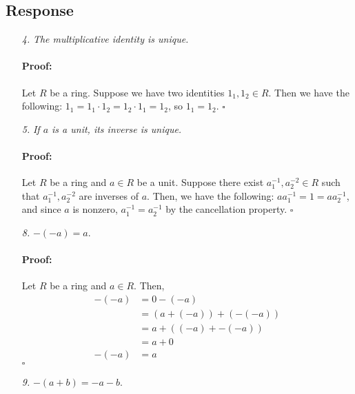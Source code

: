 \documentclass [12pt] {article}
\newenvironment{proof}{\paragraph{Proof:}}{\hfill$\square$}
\renewcommand{\it}[1]{\textit{{#1}}}
\begin{document}
\subsection*{Response}
\begin{enumerate}
    \item[\it{4.}] \it{The multiplicative identity is unique.} \vspace{-12pt}

        \begin{proof}
            Let $R$ be a ring. Suppose we have two identities $1_1, 1_2 \in R$. Then we have the
            following: $1_1 = 1_1 \cdot 1_2 = 1_2 \cdot 1_1 = 1_2$, so $1_1 = 1_2$.
        \end{proof}
    \item[\it{5.}] \it{If $a$ is a unit, its inverse is unique.} \vspace{-12pt}

        \begin{proof}
            Let $R$ be a ring and $a \in R$ be a unit. Suppose there exist $a^{-1}_1, a^{-2}_2 \in R$
            such that $a^{-1}_1, a^{-2}_2$ are inverses of $a$. Then, we have the following:
            $aa^{-1}_1 = 1 = aa^{-1}_2$, and since $a$ is nonzero, $a^{-1}_1 = a^{-1}_2$ by 
            the cancellation property.
        \end{proof}
    \item[\it{8.}] $-(-a) = a$. \vspace{-12pt}

        \begin{proof}
            Let $R$ be a ring and $a \in R$. Then, 
            \begin{align*}
                -(-a) &= 0 - (-a) \\
                      &= (a + (-a)) + (-(-a)) \\
                      &= a + ((-a) + -(-a)) \\
                      &= a + 0 \\
                -(-a) &= a
            \end{align*}
        \end{proof}
    \item[\it{9.}] $-(a + b) = -a - b$. \vspace{-12pt}


\end{enumerate}
\end{document}
